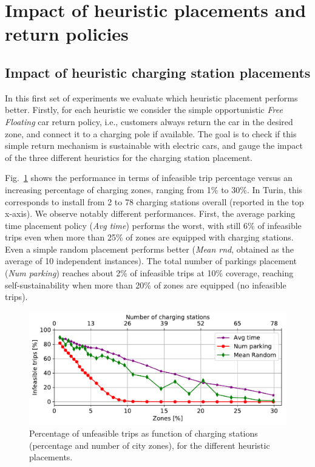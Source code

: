 \section{Impact of heuristic placements and return policies}
\label{sec:freefloating}





\subsection{Impact of heuristic charging station placements}

In this first set of experiments we evaluate which heuristic placement performs better.
Firstly, for each heuristic we consider the simple opportunistic \textit{Free Floating} car return policy, i.e., customers always return the car in the desired zone, and connect it to a charging pole if available. The goal is to check if this simple return mechanism is sustainable with electric cars, and gauge the impact of the three different heuristics for the charging station placement.
 
Fig.~\ref{fig:deathsVsZones_algorithm} shows the performance in terms of infeasible trip percentage versus an increasing percentage of charging zones, ranging from  1\% to 30\%. In Turin, this corresponds to install from 2 to 78 charging stations overall (reported in the top x-axis).
We observe notably different performances. First, the average parking time placement policy (\textit{Avg time}) performs the worst, with still 6\% of infeasible trips even when  more than 25\% of zones are equipped with charging stations. Even a simple random placement performs better (\textit{Mean rnd}, obtained as the average of 10 independent instances). The total number of parkings placement (\textit{Num parking}) reaches about 2\% of infeasible trips at 10\% coverage, reaching self-sustainability when more than 20\% of zones are equipped (no infeasible trips).

\begin{figure}[ht]
	\centering
	\includegraphics[width=0.9\columnwidth]{figures/Torino_FF_deaths_probs.pdf}
	\caption{Percentage of unfeasible trips as function of charging stations (percentage and number of city zones), for the different heuristic placements.}
	\label{fig:deathsVsZones_algorithm}
\end{figure}

